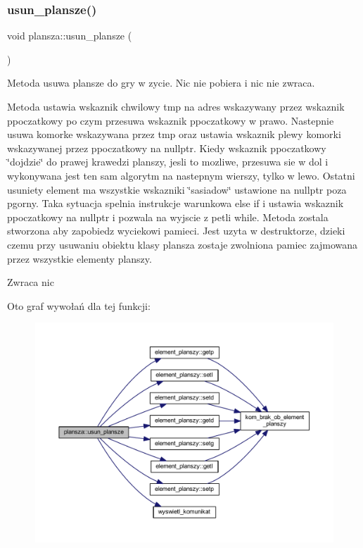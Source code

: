 \mbox{\label{classplansza_afbbb011300c83927a042e5d2c0a6820d}} 
\subsubsection{\texorpdfstring{usun\+\_\+plansze()}{usun\_plansze()}}
{\footnotesize\ttfamily void plansza\+::usun\+\_\+plansze (\begin{DoxyParamCaption}{ }\end{DoxyParamCaption})}

Metoda usuwa plansze do gry w zycie. Nic nie pobiera i nic nie zwraca.

Metoda ustawia wskaznik chwilowy tmp na adres wskazywany przez wskaznik ppoczatkowy po czym przesuwa wskaznik ppoczatkowy w prawo. Nastepnie usuwa komorke wskazywana przez tmp oraz ustawia wskaznik plewy komorki wskazywanej przez ppoczatkowy na nullptr. Kiedy wskaznik ppoczatkowy \char`\"{}dojdzie\char`\"{} do prawej krawedzi planszy, jesli to mozliwe, przesuwa sie w dol i wykonywana jest ten sam algorytm na nastepnym wierszy, tylko w lewo. Ostatni usuniety element ma wszystkie wskazniki \char`\"{}sasiadow\char`\"{} ustawione na nullptr poza pgorny. Taka sytuacja spelnia instrukcje warunkowa else if i ustawia wskaznik ppoczatkowy na nullptr i pozwala na wyjscie z petli while. Metoda zostala stworzona aby zapobiedz wyciekowi pamieci. Jest uzyta w destruktorze, dzieki czemu przy usuwaniu obiektu klasy plansza zostaje zwolniona pamiec zajmowana przez wszystkie elementy planszy. \begin{DoxyReturn}{Zwraca}
nic 
\end{DoxyReturn}
Oto graf wywołań dla tej funkcji\+:
\nopagebreak
\begin{figure}[H]
\begin{center}
\leavevmode
\includegraphics[width=350pt]{classplansza_afbbb011300c83927a042e5d2c0a6820d_cgraph}
\end{center}
\end{figure}

